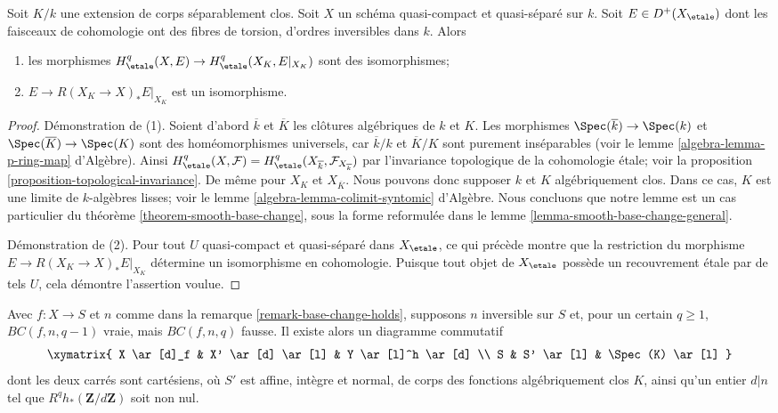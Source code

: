 \begin{lemma}
\label{lemma-smooth-base-change-separably-closed}
Soit $K/k$ une extension de corps séparablement clos. Soit $X$
un schéma quasi-compact et quasi-séparé sur $k$.
Soit $E \in D^+(X_\etale)$ dont les faisceaux de cohomologie ont des fibres
de torsion, d'ordres inversibles dans $k$. Alors
\begin{enumerate}
\item les morphismes $H^q_\etale(X, E) \to H^q_\etale(X_K, E|_{X_K})$
sont des isomorphismes;
\item $E \to R(X_K \to X)_*E|_{X_K}$ est un isomorphisme.
\end{enumerate}
\end{lemma}

\begin{proof}
Démonstration de (1). Soient d'abord $\overline{k}$ et $\overline{K}$
les clôtures algébriques
de $k$ et $K$. Les morphismes $\Spec(\overline{k}) \to \Spec(k)$ et
$\Spec(\overline{K}) \to \Spec(K)$ sont des homéomorphismes universels,
car $\overline{k}/k$ et $\overline{K}/K$ sont purement inséparables
(voir le lemme \ref{algebra-lemma-p-ring-map} d'Algèbre).
Ainsi $H^q_\etale(X, \mathcal{F}) =
H^q_\etale(X_{\overline{k}}, \mathcal{F}_{X_{\overline{k}}})$ par
l'invariance topologique de la cohomologie étale; voir la
proposition \ref{proposition-topological-invariance}.
De même pour $X_K$ et $X_{\overline{K}}$.
Nous pouvons donc supposer $k$ et $K$ algébriquement clos.
Dans ce cas, $K$ est une limite de $k$-algèbres lisses; voir le
lemme \ref{algebra-lemma-colimit-syntomic} d'Algèbre.
Nous concluons que notre lemme est un cas particulier du
théorème \ref{theorem-smooth-base-change}, sous la forme reformulée dans le
lemme \ref{lemma-smooth-base-change-general}.

\medskip\noindent
Démonstration de (2). Pour tout $U$ quasi-compact et quasi-séparé dans $X_\etale$,
ce qui précède montre que la restriction du morphisme
$E \to R(X_K \to X)_*E|_{X_K}$ détermine un isomorphisme en cohomologie.
Puisque tout objet de $X_\etale$ possède un recouvrement étale par de tels $U$,
cela démontre l'assertion voulue.
\end{proof}

\begin{lemma}
\label{lemma-base-change-does-not-hold-post}
Avec $f : X \to S$ et $n$ comme dans la remarque \ref{remark-base-change-holds},
supposons $n$ inversible sur $S$ et, pour un certain $q \geq 1$,
$BC(f, n, q - 1)$ vraie, mais $BC(f, n, q)$ fausse.
Il existe alors un diagramme commutatif
$$
\xymatrix{
X \ar[d]_f & X' \ar[d] \ar[l] & Y \ar[l]^h \ar[d] \\
S & S' \ar[l] & \Spec(K) \ar[l]
}
$$
dont les deux carrés sont cartésiens, où $S'$ est affine, intègre et normal,
de corps des fonctions algébriquement clos $K$, ainsi qu'un entier
$d | n$ tel que $R^qh_*(\mathbf{Z}/d\mathbf{Z})$ soit non nul.
\end{lemma}

